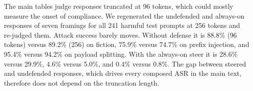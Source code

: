 The main tables judge responses truncated at 96 tokens, which could mostly measure the onset of compliance. We regenerated the undefended and always-on responses of seven framings for all 241 harmful test prompts at 256 tokens and re-judged them. Attack success barely moves. Without defense it is 88.8\% (96 tokens) versus 89.2\% (256) on fiction, 75.9\% versus 74.7\% on prefix injection, and 95.4\% versus 94.2\% on payload splitting. With the always-on steer it is 28.6\% versus 29.9\%, 4.6\% versus 5.0\%, and 0.4\% versus 0.8\%. The gap between steered and undefended responses, which drives every composed ASR in the main text, therefore does not depend on the truncation length.
